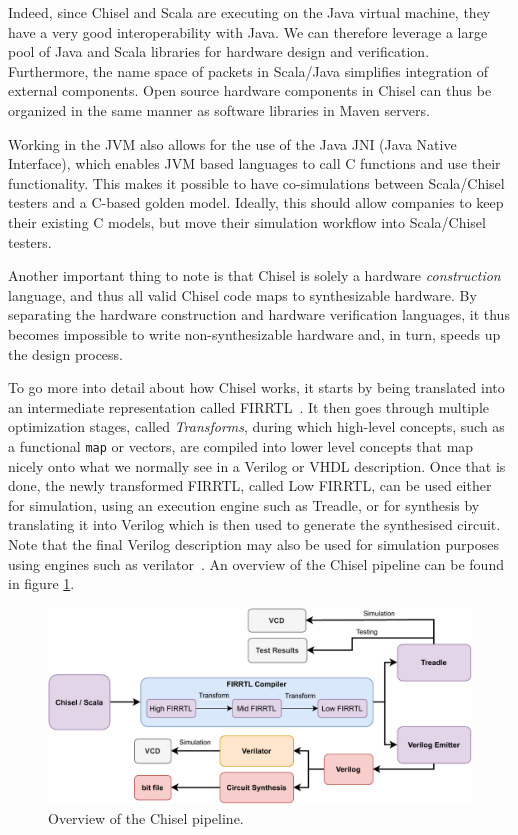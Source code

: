 \documentclass[runningheads]{llncs}
\begin{document}
Indeed, since Chisel and Scala are executing on the Java virtual machine, they have a very good interoperability with Java. 
We can therefore leverage a large pool of Java and Scala libraries for hardware design and verification. 
Furthermore, the name space of packets in Scala/Java simplifies integration of external components.
Open source hardware components in Chisel can thus be organized in the same manner as software libraries in Maven servers.

Working in the JVM also allows for the use of the Java JNI (Java Native Interface), which enables JVM based languages to call C functions and use their functionality.
This makes it possible to have co-simulations between Scala/Chisel testers and a C-based golden model. 
Ideally, this should allow companies to keep their existing C models, but move their simulation workflow into Scala/Chisel testers.

Another important thing to note is that Chisel is solely a hardware \emph{construction} language, and thus all valid Chisel code maps to synthesizable hardware.
By separating the hardware construction and hardware verification languages, it thus becomes impossible to write non-synthesizable hardware and, in turn, speeds up the design process.

To go more into detail about how Chisel works, it starts by being translated into an intermediate representation called FIRRTL~\cite{firrtl}. It then goes through multiple optimization stages, called \textit{Transforms}, during which high-level concepts, such as a functional \texttt{map} or vectors, are compiled into lower level concepts that map nicely onto what we normally see in a Verilog or VHDL description. Once that is done, the newly transformed FIRRTL, called Low FIRRTL, can be used either for simulation, using an execution engine such as Treadle, or for synthesis by translating it into Verilog which is then used to generate the synthesised circuit. Note that the final Verilog description may also be used for simulation purposes using engines such as verilator~\cite{verilator}. An overview of the Chisel pipeline can be found in figure \ref{fig:chisel-pipe}.

\begin{figure}
    \centering
    \includegraphics[width=\textwidth]{Chisel_FIRRTL_VERILOG.pdf}
    \caption{Overview of the Chisel pipeline.}
\label{fig:chisel-pipe}
\end{figure}
\end{document}
